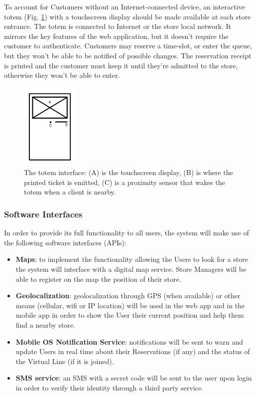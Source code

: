 To account for Customers without an Internet-connected device,
an interactive totem (Fig. \ref{fig:totem}) with a touchscreen display should be made available at each store entrance.
The totem is connected to Internet or the store local network.
It mirrors the key features of the web application, but it doesn't require the customer to
authenticate. Customers may reserve a time-slot, or enter the queue, but they won't be able to
be notified of possible changes. The reservation receipt is printed and the customer must keep it until they're
admitted to the store, otherwise they won't be able to enter.
\begin{figure}[H]
    \centering
    \includegraphics[width=0.25\textwidth]{images/totem.pdf}
    \caption{The totem interface: (A) is the touchscreen display,
    (B) is where the printed ticket is emitted, (C) is a proximity sensor that wakes the
    totem when a client is nearby.}
    \label{fig:totem}
\end{figure}

\subsubsection{Software Interfaces}
In order to provide its full functionality to all users, the system will make use of the following software interfaces (APIs):
\begin{itemize}
    \item \textbf{Maps}: to implement the functionality allowing the Users to look for a store the system will interface with a digital map service. Store Managers will be able to register on the map the position of their store.
    \item \textbf{Geolocalization}: geolocalization through GPS (when available) or other means (cellular, wifi or IP location) will be used in the web app and in the mobile app in order to show the User their current position and help them find a nearby store.
    \item \textbf{Mobile OS Notification Service}: notifications will be sent to warn and update Users in real time about their Reservations (if any) and the status of the Virtual Line (if it is joined).
    \item \textbf{SMS service}: an SMS with a secret code will be sent to the user upon login in order to verify their identity through a third party service.
\end{itemize}

